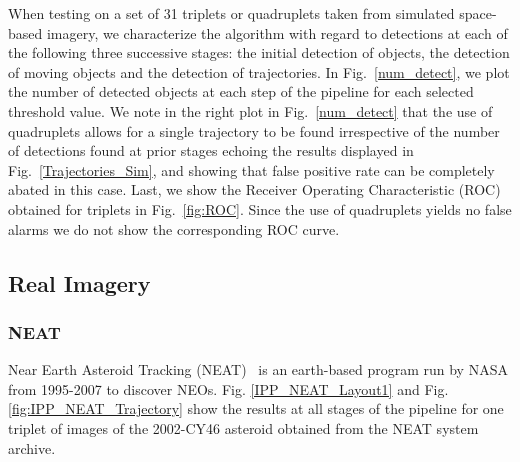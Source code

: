 When testing on a set of 31 triplets or quadruplets taken from simulated space-based imagery, we characterize the algorithm with regard to detections at each of the following three successive stages: the initial detection of objects, the detection of moving objects and the detection of trajectories.
In Fig.~\ref{num_detect}, we plot the number of detected objects at each step of the pipeline for each selected threshold value. 
We note in the right plot in Fig.~\ref{num_detect} that the use of quadruplets allows for a single trajectory to be found irrespective of the number of detections found at prior stages
echoing the results displayed in Fig.~\ref{Trajectories_Sim}, and showing that false positive rate can be completely abated in this case.
%
Last, we show the Receiver Operating Characteristic (ROC) obtained for triplets in Fig.~\ref{fig:ROC}.   
Since the use of quadruplets yields no false alarms we do not show the corresponding ROC curve.

%
\vspace{-0.4cm}
\subsection{Real Imagery}

\subsubsection{NEAT}
Near Earth Asteroid Tracking (NEAT)~\cite{neat2014} is an earth-based program run by NASA from 1995-2007 to discover NEOs.
Fig. \ref{IPP_NEAT_Layout1} and Fig. \ref{fig:IPP_NEAT_Trajectory} show the results at all stages of the pipeline for one triplet of images of the 2002-CY46 asteroid obtained from the NEAT system archive. 
 
